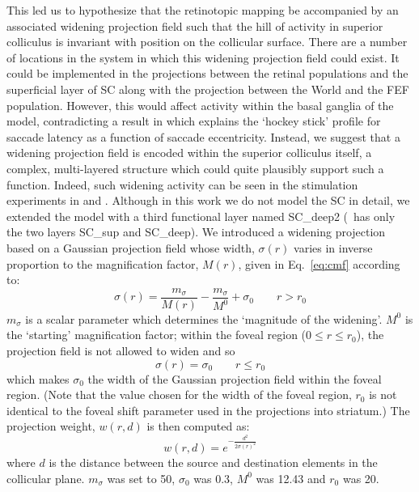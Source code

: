 \documentclass{frontiersSCNS}
\begin{document}
This led us to hypothesize that the retinotopic mapping be accompanied
by an associated widening projection field such that the hill of
activity in superior colliculus is invariant with position on the
collicular surface. There are a number of locations in the system in
which this widening projection field could exist. It could be
implemented in the projections between the retinal populations and the
superficial layer of SC along with the projection between the World
and the FEF population. However, this would affect activity within the
basal ganglia of the model, contradicting a result
in \cite{cope_basal_2017} which explains the `hockey stick' profile
for saccade latency as a function of saccade eccentricity. Instead, we
suggest that a widening projection field is encoded within the
superior colliculus itself, a complex, multi-layered structure which
could quite plausibly support such a function. Indeed, such widening
activity can be seen in the stimulation experiments
in \cite{vokoun_intralaminar_2010}
and \cite{vokoun_response_2014}. Although in this work we do not model
the SC in detail, we extended the model with a third functional layer named SC\_deep2
(\ccg~has only the two layers SC\_sup and SC\_deep). We
introduced a widening projection based on a Gaussian projection field
whose width, $\sigma(r)$ varies in inverse proportion to the
magnification factor, $M(r)$, given in Eq.~\ref{eq:cmf} according to:
\begin{equation} \label{eq:sigmar}
\sigma(r) = \frac{m_{\sigma}}{M(r)} - \frac{m_{\sigma}}{M^0} + \sigma_0 \qquad r > r_0
\end{equation}
$m_{\sigma}$ is a scalar parameter which determines the `magnitude
of the widening'. $M^0$ is the `starting' magnification factor;
within the foveal region ($0 \leq r \leq r_0$), the projection field
is not allowed to widen and so
\begin{equation} \label{eq:sigmar2}
\sigma(r) = \sigma_0 \qquad r \leq r_0
\end{equation}
which makes $\sigma_0$ the width of the Gaussian projection field
within the foveal region. (Note that the value chosen for the width
of the foveal region, $r_0$ is not identical to the foveal shift parameter used
in the  projections into striatum.)
The  projection weight, $w(r,d)$ is then
computed as:
\begin{equation} \label{eq:widening}
w(r,d) = e^{-\frac{d^2}{2\sigma\left(r\right)^2}}
\end{equation}
where $d$ is the distance between the source and destination
elements in the collicular plane.  $m_\sigma$ was set to 50, $\sigma_0$
was 0.3, $M^0$ was 12.43 and $r_0$ was 20.
\end{document}
